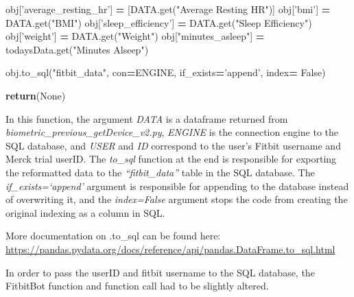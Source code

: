 \documentclass[]{book}
\newenvironment{Shaded}{\begin{snugshade}}{\end{snugshade}}
\newcommand{\StringTok}[1]{\textcolor[rgb]{0.31,0.60,0.02}{#1}}
\newcommand{\VariableTok}[1]{\textcolor[rgb]{0.00,0.00,0.00}{#1}}
\newcommand{\ControlFlowTok}[1]{\textcolor[rgb]{0.13,0.29,0.53}{\textbf{#1}}}
\newcommand{\OperatorTok}[1]{\textcolor[rgb]{0.81,0.36,0.00}{\textbf{#1}}}
\newcommand{\NormalTok}[1]{#1}
\begin{document}
\begin{Shaded}
\begin{Highlighting}[]
\NormalTok{    obj[}\StringTok{'average_resting_hr'}\NormalTok{] }\OperatorTok{=}\NormalTok{ [DATA.get(}\StringTok{"Average Resting HR"}\NormalTok{)]}
\NormalTok{    obj[}\StringTok{'bmi'}\NormalTok{] }\OperatorTok{=}\NormalTok{ DATA.get(}\StringTok{"BMI"}\NormalTok{)}
\NormalTok{    obj[}\StringTok{'sleep_efficiency'}\NormalTok{] }\OperatorTok{=}\NormalTok{ DATA.get(}\StringTok{"Sleep Efficiency"}\NormalTok{)}
\NormalTok{    obj[}\StringTok{'weight'}\NormalTok{] }\OperatorTok{=}\NormalTok{ DATA.get(}\StringTok{"Weight"}\NormalTok{)}
\NormalTok{    obj[}\StringTok{"minutes_asleep"}\NormalTok{] }\OperatorTok{=}\NormalTok{ todaysData.get(}\StringTok{"Minutes Alseep"}\NormalTok{)}
 
\NormalTok{    obj.to_sql(}\StringTok{"fitbit_data"}\NormalTok{, con}\OperatorTok{=}\NormalTok{ENGINE, if_exists}\OperatorTok{=}\StringTok{'append'}\NormalTok{, index}\OperatorTok{=} \VariableTok{False}\NormalTok{)}
   
    \ControlFlowTok{return}\NormalTok{(}\VariableTok{None}\NormalTok{)}
\end{Highlighting}
\end{Shaded}

In this function, the argument \emph{DATA} is a dataframe returned from
\emph{biometric\_previous\_getDevice\_v2.py}, \emph{ENGINE} is the
connection engine to the SQL database, and \emph{USER} and \emph{ID}
correspond to the user's Fitbit username and Merck trial userID. The
\emph{to\_sql} function at the end is responsible for exporting the
reformatted data to the \emph{``fitbit\_data''} table in the SQL
database. The \emph{if\_exists=`append'} argument is responsible for
appending to the database instead of overwriting it, and the
\emph{index=False} argument stops the code from creating the original
indexing as a column in SQL.

More documentation on .to\_sql can be found here:
\url{https://pandas.pydata.org/docs/reference/api/pandas.DataFrame.to_sql.html}

In order to pass the userID and fitbit username to the SQL database, the
FitbitBot function and function call had to be slightly altered.
\end{document}
